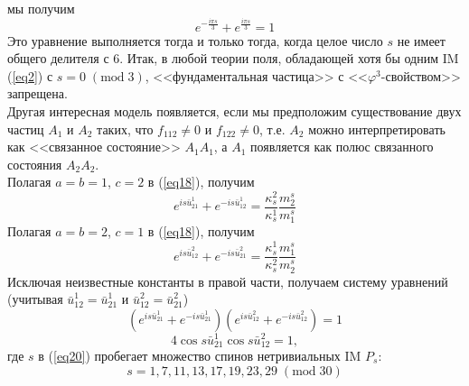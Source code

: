 \documentclass[12pt]{article}
\theoremstyle{definition}
\begin{document}
мы получим
\begin{equation}
    e^{-\frac{i\pi s}{3}}+e^{\frac{i\pi s}{3}}=1
\end{equation}
Это уравнение выполняется тогда и только тогда, когда целое число $s$ не имеет общего делителя с 6. Итак, в любой теории поля, обладающей хотя бы одним IM (\ref{eq2}) с $s = 0\; (\text{mod}\;3)$, <<фундаментальная частица>> с <<$\varphi^3$-свойством>> запрещена.\\
Другая интересная модель появляется, если мы предположим существование двух частиц $A_1$ и $A_2$ таких, что $f_{112}\neq0$ и $f_{122}\neq0$, т.е. $A_2$ можно интерпретировать как <<связанное состояние>> $A_1A_1$, а $A_1$ появляется как полюс связанного состояния $A_2A_2$.\\
Полагая $a=b=1$, $c=2$ в (\ref{eq18}), получим
\begin{equation}
    e^{is\bar{u}^1_{21}}+e^{-is\bar{u}_{12}^1}=\frac{\kappa_s^2}{\kappa_s^1}\frac{m_2^s}{m_1^s}
\end{equation}
Полагая $a=b=2$, $c=1$ в (\ref{eq18}), получим
\begin{equation}
    e^{is\bar{u}^2_{12}}+e^{-is\bar{u}_{21}^2}=\frac{\kappa_s^1}{\kappa_s^2}\frac{m_1^s}{m_2^s}
\end{equation}
Исключая неизвестные константы в правой части, получаем систему уравнений (учитывая $\bar{u}_{12}^1=\bar{u}_{21}^1$ и $\bar{u}^2_{12}=\bar{u}^2_{21}$)
\begin{equation}\label{eq20}
    (e^{is\bar{u}^1_{21}}+e^{-is\bar{u}_{21}^1})(e^{is\bar{u}^2_{12}}+e^{-is\bar{u}_{12}^2})=1
\end{equation}
\begin{equation}
    4\cos s\bar{u}^1_{21}\cos s\bar{u}^2_{12}=1,
\end{equation}
где $s$ в (\ref{eq20}) пробегает множество спинов нетривиальных IM $P_s$:
\begin{equation}\label{eq25}
    s=1,7,11,13,17,19,23,29\;(\text{mod}\;30)
\end{equation}
\end{document}
